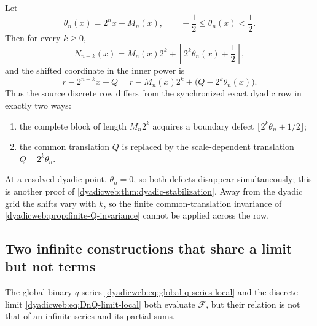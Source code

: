 \documentclass[11pt,oneside]{article}
\theoremstyle{definition}
\theoremstyle{remark}
\begin{document}
Let
\begin{equation}
 \theta_n(x)=2^nx-M_n(x),
 \qquad -\frac12\le\theta_n(x)<\frac12.                  \label{dyadicweb:eq:theta-n}
\end{equation}
Then for every $k\ge0$,
\begin{equation}
 N_{n+k}(x)
 =M_n(x)2^k+\left\lfloor2^k\theta_n(x)+\frac12\right\rfloor, \label{dyadicweb:eq:cutoff-defect}
\end{equation}
and the shifted coordinate in the inner power is
\begin{equation}
 r-2^{n+k}x+Q
 =r-M_n(x)2^k+\bigl(Q-2^k\theta_n(x)\bigr).               \label{dyadicweb:eq:shift-defect}
\end{equation}
Thus the source discrete row differs from the synchronized exact dyadic row in exactly two
ways:
\begin{enumerate}
\item the complete block of length $M_n2^k$ acquires a boundary defect
      $\lfloor2^k\theta_n+1/2\rfloor$;
\item the common translation $Q$ is replaced by the scale-dependent translation
      $Q-2^k\theta_n$.
\end{enumerate}
At a resolved dyadic point, $\theta_n=0$, so both defects disappear simultaneously; this is
another proof of \cref{dyadicweb:thm:dyadic-stabilization}.  Away from the dyadic grid the shifts vary
with $k$, so the finite common-translation invariance of
\cref{dyadicweb:prop:finite-Q-invariance} cannot be applied across the row.

\subsection{Two infinite constructions that share a limit but not terms}

The global binary $q$-series \eqref{dyadicweb:eq:global-q-series-local} and the discrete limit
\eqref{dyadicweb:eq:DnQ-limit-local} both evaluate $\mathcal F$, but their relation is not that of an
infinite series and its partial sums.
\end{document}
